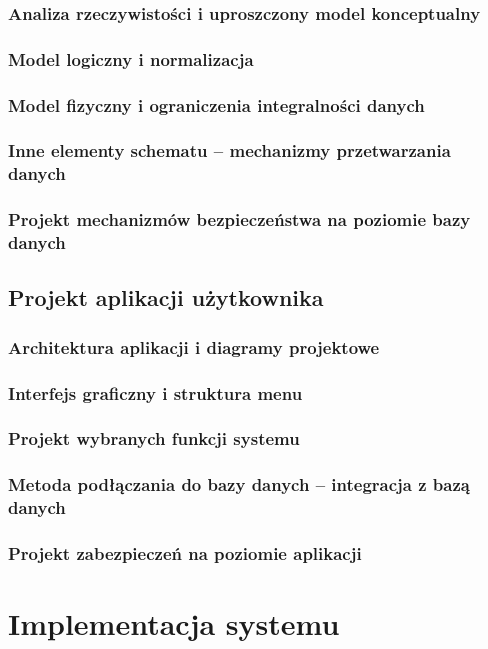 \documentclass[a4paper, 12pt]{article}
\begin{document}
\subsubsection{Analiza rzeczywistości i uproszczony model konceptualny}
\subsubsection{Model logiczny i normalizacja}
\subsubsection{Model fizyczny i ograniczenia integralności danych}
\subsubsection{Inne elementy schematu – mechanizmy przetwarzania danych}
\subsubsection{Projekt mechanizmów bezpieczeństwa na poziomie bazy danych}

\subsection{Projekt aplikacji użytkownika}
\subsubsection{Architektura aplikacji i diagramy projektowe}
\subsubsection{Interfejs graficzny i struktura menu}
\subsubsection{Projekt wybranych funkcji systemu}
\subsubsection{Metoda podłączania do bazy danych – integracja z bazą danych}
\subsubsection{Projekt zabezpieczeń na poziomie aplikacji}

\section{Implementacja systemu}
\end{document}
